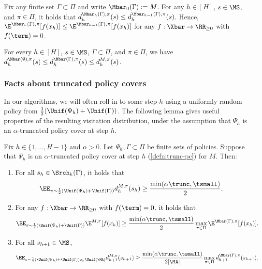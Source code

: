 \begin{fact}\label{fact:trunc-monotonicity}
Fix any finite set $\Gamma \subset \Pi$ and write $\Mbar_0(\Gamma) := M$. For any $h \in [H]$, $s \in \MS$, and $\pi \in \Pi$, it holds that $d^{\Mbar_h(\Gamma),\pi}_h(s) \leq d^{\Mbar_{h-1}(\Gamma),\pi}_h(s)$. Hence, $\E^{\Mbar_h(\Gamma),\pi}[f(x_h)] \leq \E^{\Mbar_{h-1}(\Gamma),\pi}[f(x_h)]$ for any $f: \Xbar \to \RR_{\geq 0}$ with $f(\term)=0$.
\end{fact}



\begin{fact}\label{fact:gamma-monotonicity}
For every $h \in [H]$, $s \in \MS$, $\Gamma \subset \Pi$, and $\pi \in \Pi$, we have $d^{\Mbar(\emptyset),\pi}_h(s) \leq d^{\Mbar(\Gamma),\pi}_h(s) \leq d^{M,\pi}_h(s)$.
\end{fact}

\subsubsection{Facts about truncated policy covers}

In our algorithms, we will often roll in to some step $h$ using a uniformly random policy from $\frac{1}{2}(\Unif(\Psi_h) + \Unif(\Gamma))$. The following lemma gives useful properties of the resulting visitation distribution, under the assumption that $\Psi_h$ is an $\alpha$-truncated policy cover at step $h$.

\begin{lemma}\label{lemma:srch-gamma-covering}
Fix $h \in \{1,\dots,H-1\}$ and $\alpha>0$. Let $\Psi_h, \Gamma \subset \Pi$ be finite sets of policies. Suppose that $\Psi_h$ is an $\alpha$-truncated policy cover at step $h$ (\cref{defn:trunc-pc}) for $M$. %
Then:
\begin{enumerate}
\item\label{item:h-cov-lb} For all $s_h \in \Srch_h(\Gamma)$, it holds that 
\[\EE_{\pi\sim\frac{1}{2}(\Unif(\Psi_h)+\Unif(\Gamma))} d^{M,\pi}_h(s_h) \geq \frac{\min(\alpha\trunc,\tsmall)}{2}.\]
\item\label{item:change-of-measure} For any $f:\Xbar\to\RR_{\geq 0}$ with $f(\term)=0$, it holds that 
\[\EE_{\pi\sim\frac{1}{2}(\Unif(\Psi_h)+\Unif(\Gamma))} \E^{M,\pi}[f(x_h)] \geq \frac{\min(\alpha\trunc,\tsmall)}{2} \max_{\pi\in\Pi} \E^{\Mbar(\Gamma),\pi}[f(x_h)].\]
\item\label{item:h-plus-one-cov-lb} For all $s_{h+1} \in \MS$,
\[\EE_{\pi\sim\frac{1}{2}(\Unif(\Psi_h)+\Unif(\Gamma))\circ_h \Unif(\MA)} d^{M,\pi}_{h+1}(s_{h+1}) \geq \frac{\min(\alpha\trunc,\tsmall)}{2|\MA|} \max_{\pi\in\Pi} d^{\Mbar(\Gamma),\pi}_{h+1}(s_{h+1}).\]
\end{enumerate}
\end{lemma}

